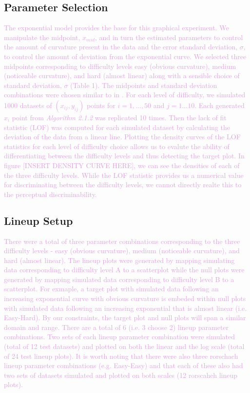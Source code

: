 \documentclass[]{interact}
\theoremstyle{plain}%
\theoremstyle{definition}
\theoremstyle{remark}
\begin{document}
\hypertarget{parameter-selection}{%
\subsection{Parameter Selection}\label{parameter-selection}}

\textcolor{Plum}{
The exponential model provides the base for this graphical experiment. 
We manipulate the midpoint, $x_{mid}$, and in turn the estimated parameters to control the amount of curvature present in the data and the error standard deviation, $\sigma$, to control the amount of deviation from the exponential curve.
We selected three midpoints corresponding to difficulty levels easy (obvious curvature), medium (noticeable curvature), and hard (almost linear) along with a sensible choice of standard deviation, $\sigma$ (Table 1).
The midpoints and standard deviation combinations were chosen similar to in \cite{vanderplas_clusters_2017}. 
For each level of difficulty, we simulated 1000 datasets of $(x_{ij}, y_{ij})$ points for $i = 1,...,50$ and $j = 1...10$. 
Each generated $x_i$ point from \textit{Algorithm 2.1.2} was replicated 10 times.  
Then the lack of fit statistic (LOF) was computed for each simulated dataset by calculating the deviation of the data from a linear line. 
Plotting the density curves of the LOF statistics for each level of difficulty choice allows us to evalute the ability of differentiating between the difficulty levels and thus detecting the target plot.
In figure [INSERT DENSITY CURVE HERE], we can see the densities of each of the three difficulty levels. 
While the LOF statistic provides us a numerical value for discriminating between the difficulty levels, we cannot directly realte this to the perceptual discriminability. 
}

\hypertarget{lineup-setup}{%
\subsection{Lineup Setup}\label{lineup-setup}}

\textcolor{Plum}{There were a total of three parameter combinations corresponding to the three difficulty levels - easy (obvious curvature), medium (noticeable curvature), and hard (almost linear). 
The lineup plots were generated by mapping simulating data corresponding to difficulty level A to a scatterplot while the null plots were generated by mapping simulated data corresponding to difficulty level B to a scatterplot. 
For exmaple, a target plot with simulated data following an increasing exponential curve with obvious curvature is embeded within null plots with simulated data following an increasing exponential that is almost linear (i.e. Easy-Hard). 
By our constraints, the target plot and null plots will span a similar domain and range. 
There are a total of 6 (i.e. 3 choose 2) lineup parameter combinations.
Two sets of each lineup parameter combination were simulated (total of 12 test datasets) and plotted on both the linear and the log scale (total of 24 test lineup plots). 
It is worth noting that there were also three rorschach lineup parameter combinations (e.g. Easy-Easy) and that each of these also had two sets of datasets simulated and plotted on both scales (12 rorscahch lineup plots).
}
\end{document}

